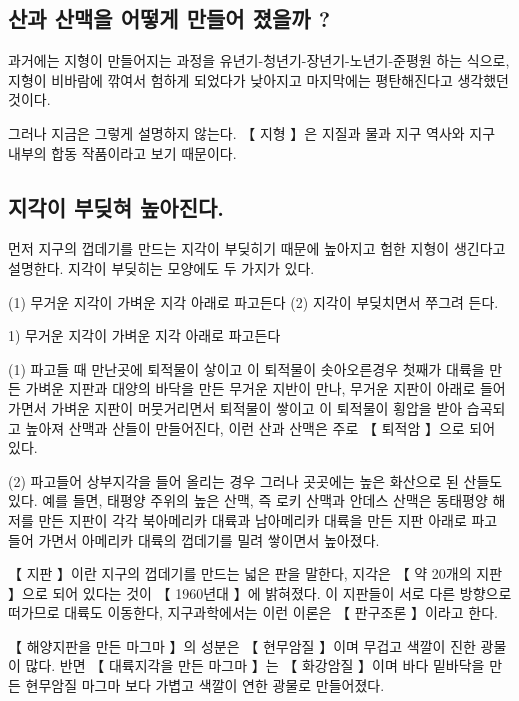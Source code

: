 \documentclass[12pt, a4paper, oneside]{book}
\begin{document}
\subsection{산과 산맥을 어떻게 만들어 졌을까 ?}


과거에는 지형이 만들어지는 과정을 유년기-청년기-장년기-노년기-준평원 하는 식으로, 지형이 비바람에 깎여서 험하게 되었다가 낮아지고 마지막에는 평탄해진다고 생각했던 것이다.

그러나 지금은 그렇게 설명하지 않는다. 【 지형 】은 지질과 물과 지구 역사와 지구 내부의 합동 작품이라고 보기 때문이다. 




\subsection{지각이 부딪혀 높아진다.}

먼저 지구의 껍데기를 만드는 지각이 부딪히기 때문에 높아지고 험한 지형이 생긴다고 설명한다. 지각이 부딪히는 모양에도 두 가지가 있다. 

	(1) 무거운 지각이 가벼운 지각 아래로 파고든다
	(2) 지각이 부딪치면서 쭈그려 든다.


1) 무거운 지각이 가벼운 지각 아래로 파고든다

(1) 파고들 때 만난곳에 퇴적물이 샇이고 이 퇴적물이 솟아오른경우
첫째가 대륙을 만든 가벼운 지판과 대양의 바닥을 만든 무거운 지반이 만나, 무거운 지판이 아래로 들어가면서 가벼운 지판이 머뭇거리면서 퇴적물이 쌓이고 이 퇴적물이 횡압을 받아 습곡되고 높아져 산맥과 산들이 만들어진다, 이런 산과 산맥은 주로 【 퇴적암 】으로 되어 있다. 

(2) 파고들어 상부지각을 들어 올리는 경우
그러나 곳곳에는 높은 화산으로 된 산들도 있다. 예를 들면, 태평양 주위의 높은 산맥, 즉 로키 산맥과 안데스 산맥은 동태평양 해저를 만든 지판이 각각 북아메리카 대륙과 남아메리카 대륙을 만든 지판 아래로 파고 들어 가면서 아메리카 대륙의 껍데기를 밀려 쌓이면서 높아졌다.






【 지판 】이란 지구의 껍데기를 만드는 넓은 판을 말한다, 지각은 【 약 20개의 지판 】으로 되어 있다는 것이 【 1960년대 】에 밝혀졌다. 이 지판들이 서로 다른 방향으로 떠가므로 대륙도 이동한다, 지구과학에서는 이런 이론은 【 판구조론 】이라고 한다. 

【 해양지판을 만든 마그마 】의 성분은 【 현무암질 】이며 무겁고 색깔이 진한 광물이 많다. 반면 【 대륙지각을 만든 마그마 】는 【 화강암질 】이며 바다 밑바닥을 만든 현무암질 마그마 보다 가볍고 색깔이 연한 광물로 만들어졌다. 
\end{document}

